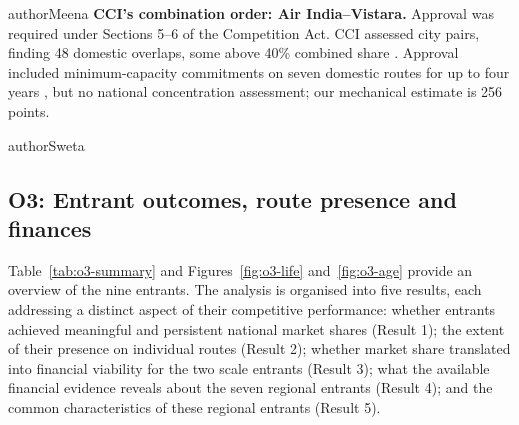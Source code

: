 \begin{mergedcontribution}{authorMeena}
\textbf{CCI's combination order: Air India--Vistara.} Approval was required under Sections 5--6 of the Competition Act. CCI assessed city pairs, finding 48 domestic overlaps, some above 40\% combined share \parencite[paras.~19, 109--111]{cci2023vistara}. Approval included minimum-capacity commitments on seven domestic routes for up to four years \parencite[paras.~115--118, 126--127]{cci2023vistara}, but no national concentration assessment; our mechanical estimate is 256 points.
\end{mergedcontribution}

\FloatBarrier
\clearpage
\begin{mergedcontribution}{authorSweta}
\subsection{O3: Entrant outcomes, route presence and finances}
\label{sec:review-o3-results}

Table~\ref{tab:o3-summary} and Figures~\ref{fig:o3-life} and~\ref{fig:o3-age} provide an overview of the nine entrants. The analysis is organised into five results, each addressing a distinct aspect of their competitive performance: whether entrants achieved meaningful and persistent national market shares (Result 1); the extent of their presence on individual routes (Result 2); whether market share translated into financial viability for the two scale entrants (Result 3); what the available financial evidence reveals about the seven regional entrants (Result 4); and the common characteristics of these regional entrants (Result 5).


\end{mergedcontribution}
